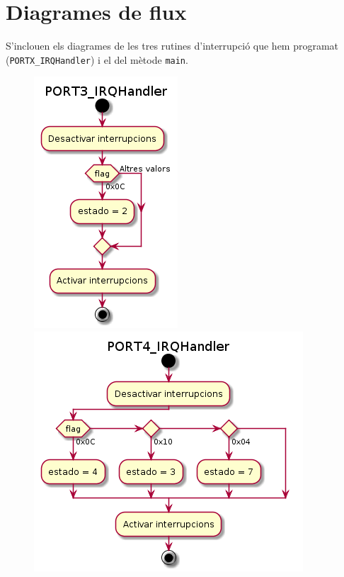 \documentclass[12pt,a4paper]{article}
\begin{document}
\section{Diagrames de flux}

S'inclouen els diagrames de les tres rutines d'interrupció que hem programat
(\texttt{PORTX\_IRQHandler}) i el del mètode \texttt{main}.

\begin{figure}[H]
  \centering
  \includegraphics[scale=.6]{PORT3_IRQHandler}
  \includegraphics[scale=.6]{PORT4_IRQHandler}
\end{figure}
\end{document}
